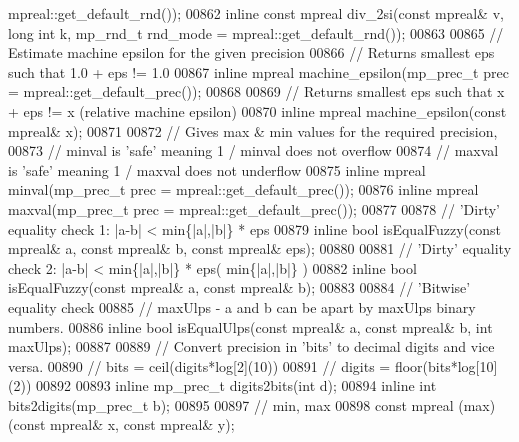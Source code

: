 \begin{DoxyCode}
      mpreal::get\_default\_rnd());
00862 \textcolor{keyword}{inline} \textcolor{keyword}{const} mpreal div\_2si(\textcolor{keyword}{const} mpreal& v, \textcolor{keywordtype}{long} \textcolor{keywordtype}{int} k, mp\_rnd\_t rnd\_mode = mpreal::get\_default\_rnd());
00863 
00865 \textcolor{comment}{// Estimate machine epsilon for the given precision}
00866 \textcolor{comment}{// Returns smallest eps such that 1.0 + eps != 1.0}
00867 \textcolor{keyword}{inline} mpreal machine\_epsilon(mp\_prec\_t prec = mpreal::get\_default\_prec());
00868 
00869 \textcolor{comment}{// Returns smallest eps such that x + eps != x (relative machine epsilon)}
00870 \textcolor{keyword}{inline} mpreal machine\_epsilon(\textcolor{keyword}{const} mpreal& x);
00871 
00872 \textcolor{comment}{// Gives max & min values for the required precision,}
00873 \textcolor{comment}{// minval is 'safe' meaning 1 / minval does not overflow}
00874 \textcolor{comment}{// maxval is 'safe' meaning 1 / maxval does not underflow}
00875 \textcolor{keyword}{inline} mpreal minval(mp\_prec\_t prec = mpreal::get\_default\_prec());
00876 \textcolor{keyword}{inline} mpreal maxval(mp\_prec\_t prec = mpreal::get\_default\_prec());
00877 
00878 \textcolor{comment}{// 'Dirty' equality check 1: |a-b| < min\{|a|,|b|\} * eps}
00879 \textcolor{keyword}{inline} \textcolor{keywordtype}{bool} isEqualFuzzy(\textcolor{keyword}{const} mpreal& a, \textcolor{keyword}{const} mpreal& b, \textcolor{keyword}{const} mpreal& eps);
00880 
00881 \textcolor{comment}{// 'Dirty' equality check 2: |a-b| < min\{|a|,|b|\} * eps( min\{|a|,|b|\} )}
00882 \textcolor{keyword}{inline} \textcolor{keywordtype}{bool} isEqualFuzzy(\textcolor{keyword}{const} mpreal& a, \textcolor{keyword}{const} mpreal& b);
00883 
00884 \textcolor{comment}{// 'Bitwise' equality check}
00885 \textcolor{comment}{//  maxUlps - a and b can be apart by maxUlps binary numbers.}
00886 \textcolor{keyword}{inline} \textcolor{keywordtype}{bool} isEqualUlps(\textcolor{keyword}{const} mpreal& a, \textcolor{keyword}{const} mpreal& b, \textcolor{keywordtype}{int} maxUlps);
00887 
00889 \textcolor{comment}{// Convert precision in 'bits' to decimal digits and vice versa.}
00890 \textcolor{comment}{//    bits   = ceil(digits*log[2](10))}
00891 \textcolor{comment}{//    digits = floor(bits*log[10](2))}
00892 
00893 \textcolor{keyword}{inline} mp\_prec\_t digits2bits(\textcolor{keywordtype}{int} d);
00894 \textcolor{keyword}{inline} \textcolor{keywordtype}{int}       bits2digits(mp\_prec\_t b);
00895 
00897 \textcolor{comment}{// min, max}
00898 \textcolor{keyword}{const} mpreal (max)(\textcolor{keyword}{const} mpreal& x, \textcolor{keyword}{const} mpreal& y);

\end{DoxyCode}
